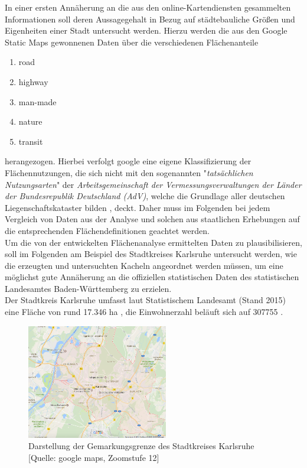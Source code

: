 \documentclass[12pt,a4paper]{scrartcl}
\begin{document}
In einer ersten Annäherung an die aus den online-Kartendiensten gesammelten Informationen soll deren Aussagegehalt in Bezug auf städtebauliche Größen und Eigenheiten einer Stadt untersucht werden. Hierzu werden die aus den Google Static Maps gewonnenen Daten über die verschiedenen Flächenanteile 
\begin{enumerate}
\item road
\item highway
\item man-made
\item nature
\item transit
\end{enumerate}
herangezogen. Hierbei verfolgt google eine eigene Klassifizierung der Flächennutzungen, die sich nicht mit den sogenannten "\textit{tatsächlichen Nutzungsarten}" der  \textit{Arbeitsgemeinschaft der Vermessungsverwaltungen der Länder der Bundesrepublik Deutschland (AdV)}, welche die Grundlage aller deutschen Liegenschaftskataster bilden \cite{advnutz} , deckt. Daher muss im Folgenden bei jedem Vergleich von Daten aus der Analyse und solchen aus staatlichen Erhebungen auf die entsprechenden Flächendefinitionen geachtet werden.\\
\newline
Um die von der entwickelten Flächenanalyse ermittelten Daten zu plausibilisieren, soll im Folgenden am Beispiel des Stadtkreises Karlsruhe untersucht werden, wie die erzeugten und untersuchten Kacheln angeordnet werden müssen, um eine möglichst gute Annäherung an die offiziellen statistischen Daten des statistischen Landesamtes  Baden-Württemberg \cite{StatBaWu_Flaeche} zu erzielen.\\
\newline
Der Stadtkreis Karlsruhe umfasst laut Statistischem Landesamt (Stand 2015) eine Fläche von rund \num{17.346} \si{\hectare} \cite{StatBaWu_Flaeche}, die Einwohnerzahl beläuft sich auf \num{307755} \cite{StatBaWu_Einw}. 
%
\begin{figure}
  \centering
    \includegraphics[width=0.55\textwidth]{Stadtgebiet_KA_zoom12.PNG}
    \caption{Darstellung der Gemarkungsgrenze des Stadtkreises Karlsruhe [Quelle: google maps, Zoomstufe 12]}
    \label{fig:Stadtgebiet_KA}
\end{figure}
\end{document}
